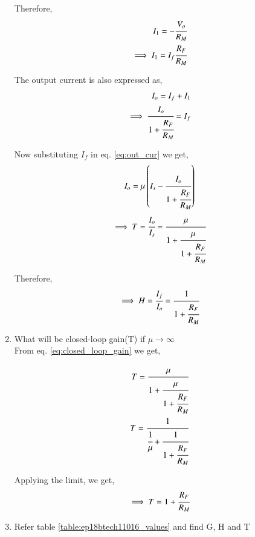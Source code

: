 \begin{enumerate}[label=\thesection.\arabic*.,ref=\thesection.\theenumi]
Therefore,
\begin{align}
    I_1 = -\cfrac{V_o}{R_M}\\
    \implies I_1 = I_f \cfrac{R_F}{R_M}
\end{align}

The output current is also expressed as,
\begin{align}
    I_o = I_f + I_1\\
    \implies \cfrac{I_o}{1 + \cfrac{R_F}{R_M}} = I_f
\end{align}

Now substituting $I_f$ in  eq. \ref{eq:out_cur} we get,
\begin{align}
    I_o = \mu \left(I_s - \cfrac{I_o}{1 + \cfrac{R_F}{R_M}}\right)\\
\end{align}
\begin{align}
    \implies T = \cfrac{I_o}{I_s} = \cfrac{\mu}{1 + \cfrac{\mu}{1 + \cfrac{R_F}{R_M}}}
    \label{eq:closed_loop_gain}
\end{align}

Therefore,
\begin{align}
    \implies H = \cfrac{I_f}{I_o} = \cfrac{ 1 }{1 + \cfrac{R_F}{R_M}}
    \label{eq:feedback_gain}
\end{align}


\item What will be closed-loop gain(T) if $\mu \to \infty$
\\
\solution From eq. \ref{eq:closed_loop_gain} we get,

\begin{align}
    T = \cfrac{\mu}{1 + \cfrac{\mu}{1 + \cfrac{R_F}{R_M}}}\\
    T = \cfrac{1}{\cfrac{1}{\mu} + \cfrac{1}{1 + \cfrac{R_F}{R_M}}}
\end{align}

Applying the limit, we get,
\begin{align}
    \implies T = 1 + \cfrac{R_F}{R_M}
\end{align}


\item Refer table \ref{table:ep18btech11016_values} and find G, H and T

\begin{table}[!ht]
    \centering
    
    \caption{}
    \label{table:ep18btech11016_values}
\end{table}


\end{enumerate}
